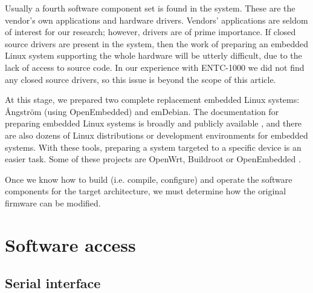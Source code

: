 \documentclass[conference]{IEEEtran}
\newcommand{\nota}[1]{}
\begin{document}
Usually a fourth software component set is found in the system. These are the vendor's own applications and hardware drivers. Vendors' applications are seldom of interest for our research; however, drivers are of prime importance. If closed source drivers are present in the system, then the work of preparing an embedded Linux system supporting the whole hardware will be utterly difficult, due to the lack of access to source code. In our experience with ENTC-1000 we did not find any closed source drivers, so this issue is beyond the scope of this article.
 
\nota{
El trabajo realizado en este punto fue la preparación
de dos sistemas Linux embebidos completos de reemplazo: Amstrong y emDebian.
La documentación para preparar sistemas Linux embebidos es amplia y públicamente
disponible (referencias). Además, existen decenas de
distribuciones Linux para embebidos,
o entornos de desarrollo de distribuciones Linux para embebidos
\footnote{No confundir distribución con entorno de desarrollo}. Estas herramientas
facilitan la preparación de un sistema para un dispositivo específico.
Algunas de estos proyectos son Openwrt, Buildroot, u OpenEmbedded (referencias).

Una vez que se tiene el conocimiento en cómo construir (compilar y configurar)
y operar los componentes de software para la arquitectura destino, se
debe realizar un análisis de si es posible o no modificar el firmware original.
}

At this stage, we prepared two complete replacement embedded Linux systems: Ångström (using OpenEmbedded) and emDebian. The documentation for preparing embedded Linux systems is broadly and publicly available \cite{emb1, emb2, freeelectron}, and there are also dozens of Linux distributions or development environments for embedded systems. With these tools, preparing a system targeted to a specific device is an easier task. Some of these projects are OpenWrt, Buildroot or OpenEmbedded \cite{openwrt, openembedded, buildroot}.

Once we know how to build (i.e. compile, configure) and operate the software components for the target architecture, we must determine how the original firmware can be modified.

\section{Software access}

\subsection{Serial interface}
\nota {
Existen varias posibilidades para conectarse a un dispositivo 
Linux embebido, pero una de las disponibles, mas comúnmente encontrada es
a través de una consola serial. En los sistemas Linux, la 
consola serial permite ver los mensajes de error del kernel,
y también interactuar con el gestor de arranque.
}
\end{document}
